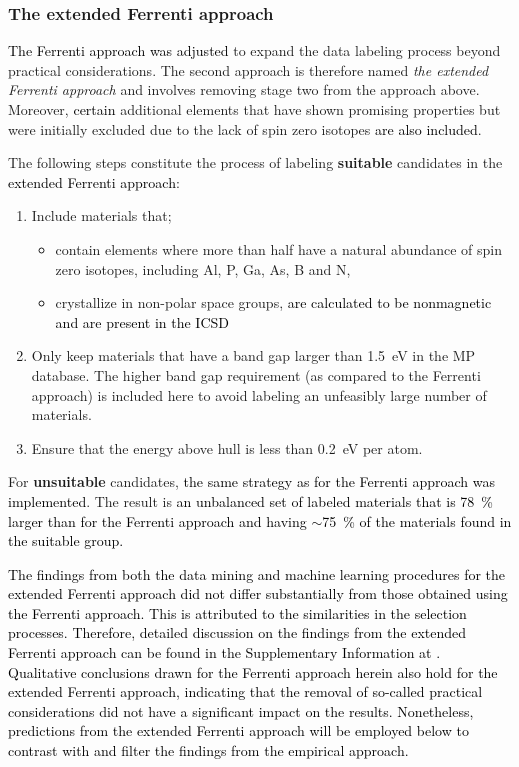 \documentclass[superscriptaddress,unsortedaddress,
 amsmath,amssymb,
 aps,
]{revtex4-2}
\newcommand{\mrk}[1]{\textcolor{black}{#1}}
\begin{document}
\subsubsection*{The extended Ferrenti approach}
\mrk{The Ferrenti approach was adjusted} to expand the data labeling process beyond practical  considerations. The second approach is therefore named \emph{the extended Ferrenti approach} and involves removing stage two from the approach above. Moreover, \mrk{certain} additional elements that have shown promising properties but were initially excluded due to the lack of spin zero isotopes \mrk{are also included}. 

The following steps constitute the process of labeling \textbf{suitable} candidates in the \mrk{extended Ferrenti approach}:
\begin{enumerate}
    \item Include materials that; 
    \begin{itemize}
        \item contain elements where more than half have a natural abundance of spin zero isotopes, including Al, P, Ga, As, B and N, 
        \item crystallize in non-polar space groups,
        \mrk{are calculated to be nonmagnetic and are present in the ICSD} 
    \end{itemize}
    \item Only keep materials that have a band gap larger than \SI{1.5}{\electronvolt} in the MP database. The higher band gap requirement (as compared to the Ferrenti approach) is included here to avoid labeling an unfeasibly large number of materials. 
    \item Ensure that the energy above hull is less than \SI{0.2}{\electronvolt} per atom. 
\end{enumerate}

For \textbf{unsuitable} candidates, \mrk{the same strategy as for the Ferrenti approach was implemented}. The result is \mrk{an unbalanced set of labeled materials that is   \SI{78}{\percent} larger than for the Ferrenti approach and having $\sim$\SI{75}{\percent} of the materials found in the suitable group.} 

\mrk{The findings from both the data mining and machine learning procedures for the extended Ferrenti approach did not differ substantially from those obtained using the Ferrenti approach. This is attributed to the similarities in the selection processes. Therefore, detailed discussion on the findings from the extended Ferrenti approach can be found in the Supplementary Information at \cite{supplementary}. Qualitative conclusions drawn for the Ferrenti approach herein also hold for the extended Ferrenti approach, indicating that the removal of so-called practical considerations did not have a significant impact on the results. Nonetheless, predictions from the extended Ferrenti approach will be employed below to contrast with and filter the findings from the empirical approach. }
\end{document}
